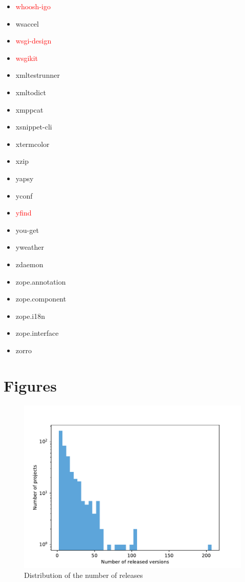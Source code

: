\documentclass{l4proj}
\begin{document}
\begin{appendices}
{\begin{itemize}
\item\textcolor{red}{whoosh-igo}
\item wsaccel
\item\textcolor{red}{wsgi-design}
\item\textcolor{red}{wsgikit}
\item xmltestrunner
\item xmltodict
\item xmppcat
\item xsnippet-cli
\item xtermcolor
\item xzip
\item yapsy
\item yconf
\item\textcolor{red}{yfind}
\item you-get
\item yweather
\item zdaemon
\item zope.annotation
\item zope.component
\item zope.i18n
\item zope.interface
\item zorro
\end{itemize}
}%

\section{Figures}

\begin{figure}[H]
\centering
\caption{Distribution of the number of releases}
\label{DistributionAllVersions}
\includegraphics[height=0.4\textheight]{images/evaluation/distribution_all_versions}
\end{figure}


\end{appendices}
\end{document}
